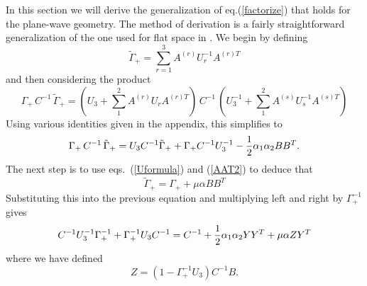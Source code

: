 \documentclass[a4paper,12pt]{article}
\begin{document}
In this section we will derive the generalization of
eq.(\ref{factorize}) that holds for the plane-wave geometry. The
method of derivation is a fairly straightforward generalization of
the one used for flat space in \cite{Green:1982tc}. We begin by
defining
\begin{equation} \label{tildeG}
\tilde\Gamma_+ = \sum_{r=1}^3 A^{(r)} U_r^{-1} A^{(r)T}
\end{equation}
and then considering the product
\begin{equation}
\Gamma_+\,  C^{-1}\,  \tilde\Gamma_+ = (U_3 + \sum_1^2 A^{(r)} U_r
A^{(r)T})\, C^{-1}\, (U_3^{-1} + \sum_1^2 A^{(s)} U_s^{-1}
A^{(s)T})
\end{equation}
Using various identities given in the appendix, this simplifies to
\begin{equation}
\Gamma_+\,  C^{-1}\,  \tilde\Gamma_+ = U_3 C^{-1} \tilde\Gamma_+ +
\Gamma_+ C^{-1} U_3^{-1} -{1\over 2} \alpha_1 \alpha_2 B B^T.
\end{equation}
The next step is to use eqs.~(\ref{Uformula}) and (\ref{AAT2}) to
deduce that
\begin{equation}
\tilde\Gamma_+ = \Gamma_+ + \mu \alpha BB^T
\end{equation}
Substituting this into the previous equation and multiplying left
and right by $\Gamma_+^{-1}$ gives
\begin{equation} \label{idwithZ}
C^{-1} U_3^{-1} \Gamma_+^{-1} + \Gamma_+^{-1} U_3 C^{-1} = C^{-1}
+ {1\over2} \alpha_1 \alpha_2 Y Y^T + \mu \alpha Z Y^T
\end{equation}
where we have defined
\begin{equation}
Z = (1 -\Gamma_+^{-1} U_3) C^{-1} B.
\end{equation}
\end{document}
